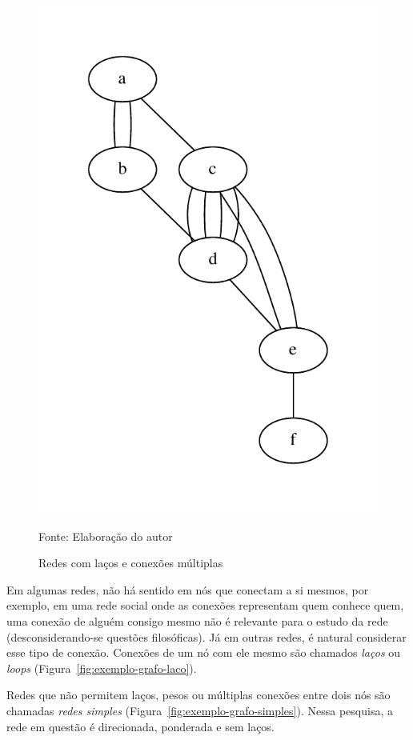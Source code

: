 \documentclass[12pt,a4paper]{article}
\theoremstyle{hypo}
\newcommand{\source}[1]{\vspace{-10pt} \caption*{Fonte: {#1}} }
\begin{document}
\begin{figure}[ht]
{        \includegraphics[scale=0.5]{multiple.pdf}
        \label{fig:exemplo-grafo-multiplo}
    }    
    \caption{Redes com laços e conexões múltiplas}
    \source{Elaboração do autor}
\end{figure}

Em algumas redes, não há sentido em nós que conectam a si mesmos, por exemplo, em uma rede social onde as conexões representam quem conhece quem, uma conexão de alguém consigo mesmo não é relevante para o estudo da rede (desconsiderando-se questões filosóficas). Já em outras redes, é natural considerar esse tipo de conexão. Conexões de um nó com ele mesmo são chamados \textit{laços} ou \textit{loops} (Figura~\ref{fig:exemplo-grafo-laco}).

Redes que não permitem laços, pesos ou múltiplas conexões entre dois nós são chamadas \textit{redes simples} (Figura~\ref{fig:exemplo-grafo-simples}). Nessa pesquisa, a rede em questão é direcionada, ponderada e sem laços.
\end{document}
